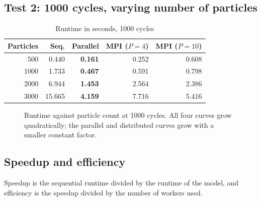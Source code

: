 \documentclass[sigconf]{acmart}
\begin{document}
\subsection{Test 2: 1000 cycles, varying number of particles}

\begin{table}[h]
\centering
\caption{Runtime in seconds, 1000 cycles}
\begin{tabular}{@{}rrrrr@{}}
\toprule
Particles & Seq. & Parallel & MPI ($P{=}4$) & MPI ($P{=}10$) \\
\midrule
500  & 0.440  & \textbf{0.161} & 0.252 & 0.608 \\
1000 & 1.733  & \textbf{0.467} & 0.591 & 0.798 \\
2000 & 6.944  & \textbf{1.453} & 2.564 & 2.386 \\
3000 & 15.665 & \textbf{4.159} & 7.716 & 5.416 \\
\bottomrule
\end{tabular}
\end{table}

\begin{figure}[h]
\centering
{}
\caption{Runtime against particle count at 1000 cycles. All four curves grow quadratically; the
parallel and distributed curves grow with a smaller constant factor.}
\end{figure}

\subsection{Speedup and efficiency}

Speedup is the sequential runtime divided by the runtime of the model, and efficiency is the speedup
divided by the number of workers used.
\end{document}

